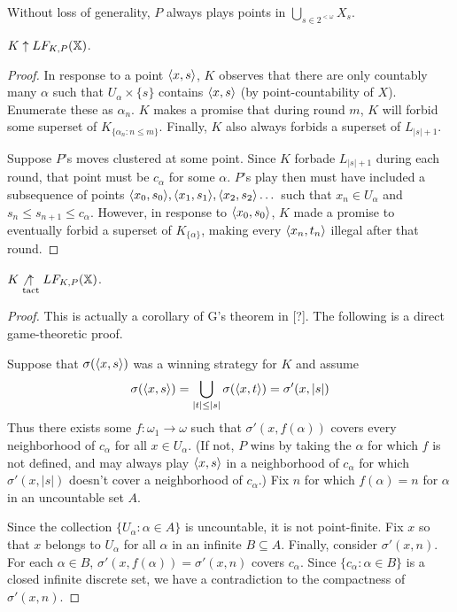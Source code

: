 \begin{proposition}
Without loss of generality, $P$ always plays points in $\bigcup_{s \in 2^{<\omega}} X_s$.
\end{proposition}

\begin{proposition}
$K \uparrow LF_{K,P}(\mathbb{X})$.
\end{proposition}

\begin{proof}
In response to a point $\langle x,s\rangle$, $K$ observes that there are only countably many $\alpha$ such that $U_\alpha \times \{s\}$ contains $\langle x,s\rangle$ (by point-countability of $X$). Enumerate these as $\alpha_n$. $K$ makes a promise that during round $m$, $K$ will forbid some superset of $K_{\{\alpha_n : n\leq m\}}$. Finally, $K$ also always forbids a superset of $L_{|s|+1}$.

Suppose $P$'s moves clustered at some point. Since $K$ forbade $L_{|s|+1}$ during each round, that point must be $c_\alpha$ for some $\alpha$. $P$'s play then must have included a subsequence of points $\langle x_0,s_0\rangle,\langle x_1,s_1\rangle,\langle x_2,s_2\rangle\dots$ such that $x_n \in U_\alpha$ and $s_n \leq s_{n+1} \leq c_\alpha$. However, in response to $\langle x_0,s_0\rangle$, $K$ made a promise to eventually forbid a superset of $K_{\{\alpha\}}$, making every $\langle x_n,t_n\rangle$ illegal after that round.
\end{proof}

\begin{theorem}
$K\not\underset{\text{tact}}{\uparrow}LF_{K,P}(\mathbb{X})$.
\end{theorem}

\begin{proof}
This is actually a corollary of G's theorem in [?]. The following is a direct game-theoretic proof.

Suppose that $\sigma(\langle x,s\rangle)$ was a winning strategy for $K$ and assume 
  \[
    \sigma(\langle x,s\rangle) = \bigcup_{|t|\leq |s|} \sigma(\langle x,t\rangle) = \sigma'(x,|s|)
  \]
Thus there exists some $f: \omega_1 \to \omega$ such that $\sigma'(x,f(\alpha))$ covers every neighborhood of $c_\alpha$ for all $x\in U_\alpha$. (If not, $P$ wins by taking the $\alpha$ for which $f$ is not defined, and may always play $\langle x,s\rangle$ in a neighborhood of $c_\alpha$ for which $\sigma'(x,|s|)$ doesn't cover a neighborhood of $c_\alpha$.) Fix $n$ for which $f(\alpha)=n$ for $\alpha$ in an uncountable set $A$.

Since the collection $\{U_\alpha : \alpha \in A\}$ is uncountable, it is not point-finite. Fix $x$ so that $x$ belongs to $U_\alpha$ for all $\alpha$ in an infinite $B \subseteq A$. Finally, consider $\sigma'(x,n)$. For each $\alpha\in B$, $\sigma'(x,f(\alpha))=\sigma'(x,n)$ covers $c_\alpha$. Since $\{c_\alpha : \alpha \in B\}$ is a closed infinite discrete set, we have a contradiction to the compactness of $\sigma'(x,n)$.
\end{proof}



